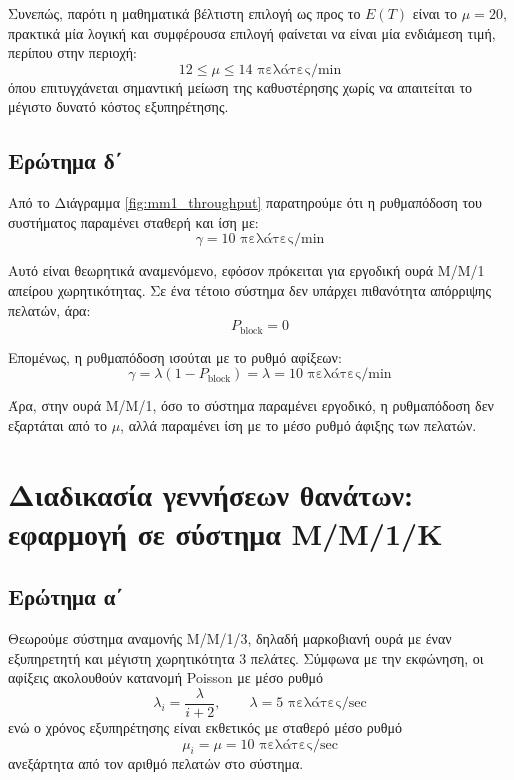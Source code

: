 \documentclass{article}
\begin{document}
Συνεπώς, παρότι η μαθηματικά βέλτιστη επιλογή ως προς το \(E(T)\) είναι το
\(\mu = 20\), πρακτικά μία λογική και συμφέρουσα επιλογή φαίνεται να είναι μία
ενδιάμεση τιμή, περίπου στην περιοχή:
\begin{equation}
12 \leq \mu \leq 14 \text{ πελάτες/min}
\end{equation}
όπου επιτυγχάνεται σημαντική μείωση της καθυστέρησης χωρίς να απαιτείται το
μέγιστο δυνατό κόστος εξυπηρέτησης.

\subsection{Ερώτημα δ΄}

Από το Διάγραμμα \ref{fig:mm1_throughput} παρατηρούμε ότι η ρυθμαπόδοση
του συστήματος παραμένει σταθερή και ίση με:
\begin{equation}
\gamma = 10 \text{ πελάτες/min}
\end{equation}

Αυτό είναι θεωρητικά αναμενόμενο, εφόσον πρόκειται για εργοδική ουρά Μ/Μ/1
απείρου χωρητικότητας. Σε ένα τέτοιο σύστημα δεν υπάρχει πιθανότητα
απόρριψης πελατών, άρα:
\begin{equation}
P_{\text{block}} = 0
\end{equation}

Επομένως, η ρυθμαπόδοση ισούται με το ρυθμό αφίξεων:
\begin{equation}
\gamma = \lambda (1 - P_{\text{block}}) = \lambda = 10 \text{ πελάτες/min}
\end{equation}

Άρα, στην ουρά Μ/Μ/1, όσο το σύστημα παραμένει εργοδικό, η ρυθμαπόδοση δεν
εξαρτάται από το \(\mu\), αλλά παραμένει ίση με το μέσο ρυθμό άφιξης των
πελατών.

\newpage
\section{Διαδικασία γεννήσεων θανάτων: εφαρμογή σε σύστημα Μ/Μ/1/Κ}

\subsection{Ερώτημα α΄}

Θεωρούμε σύστημα αναμονής Μ/Μ/1/3, δηλαδή μαρκοβιανή ουρά με έναν
εξυπηρετητή και μέγιστη χωρητικότητα 3 πελάτες. Σύμφωνα με την εκφώνηση, οι
αφίξεις ακολουθούν κατανομή Poisson με μέσο ρυθμό
\begin{equation}
\lambda_i=\frac{\lambda}{i+2}, \qquad \lambda=5 \text{ πελάτες/sec}
\end{equation}
ενώ ο χρόνος εξυπηρέτησης είναι εκθετικός με σταθερό μέσο ρυθμό
\begin{equation}
\mu_i=\mu=10 \text{ πελάτες/sec}
\end{equation}
ανεξάρτητα από τον αριθμό πελατών στο σύστημα.
\end{document}
